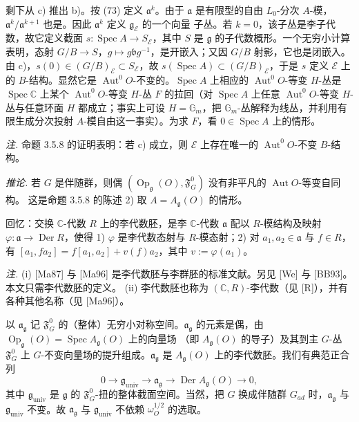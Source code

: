 剩下从 c) 推出 b)。按 (73) 定义 $\mathfrak{a}^{k}$。由于 $\mathfrak{a}$ 是有限型的自由 $L_{0}$-分次 $A$-模，$\mathfrak{a}^{k}/\mathfrak{a}^{k+1}$ 也是。因此 $\mathfrak{a}^{k}$ 定义 $\mathfrak{g}_{\mathcal{E}}$ 的一个向量%
子丛。若 $k=0$，该子丛是李子代数，故它定义截面 $s:\operatorname{Spec}A\to S_{\mathcal{E}}$，其中 $S$ 是 $\mathfrak{g}$ 的子代数概形。一个无穷小计算表明，态射 $G/B\to S$，$g\mapsto g\mathfrak{b}g^{-1}$，是开嵌入；又因 $G/B$ 射影，它也是闭嵌入。由 c)，$s(0)\in(G/B)_{\mathcal{E}}\subset S_{\mathcal{E}}$，故 $s(\operatorname{Spec}A)\subset(G/B)_{\mathcal{E}}$，于是 $s$ 定义 $\mathcal{E}$ 上的 $B$-结构。显然它是 $\operatorname{Aut}^{0}O$-不变的。$\operatorname{Spec}A$ 上相应的 $\operatorname{Aut}^{0}O$-等变 $H$-丛是 $\operatorname{Spec}\mathbb{C}$ 上某个 $\operatorname{Aut}^{0}O$-等变 $H$-丛 $F$ 的拉回（对 $\operatorname{Spec}A$ 上任意 $\operatorname{Aut}^{0}O$-等变 $H$-丛与任意环面 $H$ 都成立；事实上可设 $H=\mathbb{G}_{m}$，把 $\mathbb{G}_{m}$-丛解释为线丛，并利用有限生成分次投射 $A$-模自由这一事实）。为求 $F$，看 $0\in\operatorname{Spec}A$ 上的情形。

\emph{注.} 命题 3.5.8 的证明表明：若 c) 成立，则 $\mathcal{E}$ 上存在唯一的 $\operatorname{Aut}^{0}O$-不变 $B$-结构。

 \emph{推论.} 若 $G$ 是伴随群，则偶 $(\operatorname{Op}_{\mathfrak{g}}(O),\mathfrak{F}^{0}_{G})$ 没有非平凡的 $\operatorname{Aut}O$-等变自同构。
这是命题 3.5.8 的陈述 2) 取 $A=A_{\mathfrak{g}}(O)$ 的情形。

 回忆：交换 $\mathbb{C}$-代数 $R$ 上的李代数胚，是李 $\mathbb{C}$-代数 $\mathfrak{a}$ 配以 $R$-模结构及映射 $\varphi:\mathfrak{a}\to\operatorname{Der}R$，使得 1) $\varphi$ 是李代数态射与 $R$-模态射；2) 对 $a_{1},a_{2}\in\mathfrak{a}$ 与 $f\in R$，有 $[a_{1},fa_{2}]=f[a_{1},a_{2}]+v(f)a_{2}$，其中 $v:=\varphi(a_{1})$。

\emph{注.}
(i) [Ma87] 与 [Ma96] 是李代数胚与李群胚的标准文献。另见 [We] 与 [BB93]。本文只需李代数胚的定义。
(ii) 李代数胚也称为 $(\mathbb{C},R)$-李代数（见 [R]），并有各种其他名称（见 [Ma96]）。

 以 $\mathfrak{a}_{\mathfrak{g}}$ 记 $\mathfrak{F}^{0}_{G}$ 的（整体）无穷小对称空间。$\mathfrak{a}_{\mathfrak{g}}$ 的元素是偶，由 $\operatorname{Op}_{\mathfrak{g}}(O)=\operatorname{Spec}A_{\mathfrak{g}}(O)$ 上的向量场%
（即 $A_{\mathfrak{g}}(O)$ 的导子）及其到主 $G$-丛 $\mathfrak{F}^{0}_{G}$ 上 $G$-不变向量场的提升组成。$\mathfrak{a}_{\mathfrak{g}}$ 是 $A_{\mathfrak{g}}(O)$ 上的李代数胚。我们有典范正合列
\[
0\to\mathfrak{g}_{\mathrm{univ}}\to\mathfrak{a}_{\mathfrak{g}}\to\operatorname{Der}A_{\mathfrak{g}}(O)\to0,
\]
其中 $\mathfrak{g}_{\mathrm{univ}}$ 是 $\mathfrak{g}$ 的 $\mathfrak{F}^{0}_{G}$-扭的整体截面空间。当然，把 $G$ 换成伴随群 $G_{ad}$ 时，$\mathfrak{a}_{\mathfrak{g}}$ 与 $\mathfrak{g}_{\mathrm{univ}}$ 不变。故 $\mathfrak{a}_{\mathfrak{g}}$ 与 $\mathfrak{g}_{\mathrm{univ}}$ 不依赖 $\omega_{O}^{1/2}$ 的选取。

